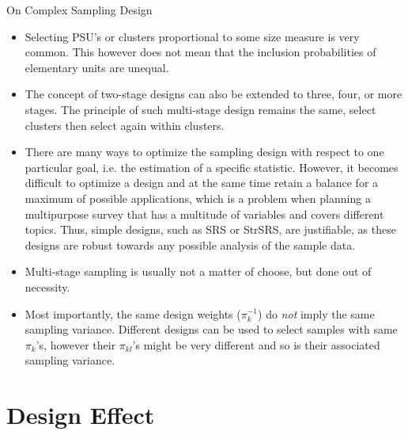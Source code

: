 \documentclass[10pt]{beamer}\usepackage[]{graphicx}\usepackage[]{color}
\begin{document}
\begin{frame}{On Complex Sampling Design}
\begin{itemize}
\item<1|only@1> Selecting PSU's or clusters proportional to some size measure is very common.
This however does not mean that the inclusion probabilities of elementary units are unequal.

\item<2|only@2>  The concept of two-stage designs can also be extended to three, four, or more stages.
The principle of such multi-stage design remains the same, select clusters then select again within clusters.

\item<3|only@3>  There are many ways to optimize the sampling design with respect to one particular goal, i.e. the estimation of a specific statistic. However, it becomes difficult to optimize a design and at the same time retain a balance for a maximum of possible applications, which is a problem when planning a multipurpose survey that has a multitude of variables and covers different topics.
Thus, simple designs,  such as SRS or StrSRS, are justifiable, as these designs are robust towards any possible analysis of the sample data.

\item<4|only@4>  Multi-stage sampling is usually not a matter of choose, but done out of necessity.

\item<5|only@5>  Most importantly, the same design weights ($\pi_k^{-1}$) do \emph{not} imply the same sampling variance. Different designs can be used to select samples with same $\pi_k$'s, however their $\pi_{kl}$'s might be very different and so is their associated sampling variance.

\end{itemize}

\end{frame}

\section{Design Effect}
\end{document}
